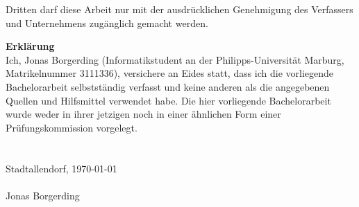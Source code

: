 \documentclass[ngerman]{article}
\begin{document}
    \begin{center}
        Dritten darf diese Arbeit nur mit der ausdrücklichen Genehmigung des Verfassers und Unternehmens zugänglich gemacht werden.
    \end{center}
    \newpage
    \textbf{Erklärung}\\
    Ich, Jonas Borgerding (Informatikstudent an der Philipps-Universität Marburg, Matrikelnummer 3111336), versichere an Eides statt, dass ich die vorliegende Bachelorarbeit selbstständig verfasst und keine anderen als die angegebenen Quellen und Hilfsmittel verwendet habe. Die hier vorliegende Bachelorarbeit wurde weder in ihrer jetzigen noch in einer ähnlichen Form einer Prüfungskommission vorgelegt.\\\\\\
    Stadtallendorf, \today\\\\
    Jonas Borgerding\newpage
    \tableofcontents\newpage
    \pagestyle{fancy}
    \renewcommand{\sectionmark}[1]{\markright{#1}}
    \fancyhf{}
    \fancyfoot[C]{\thepage}
    \setcounter{page}{1}
\end{document}
